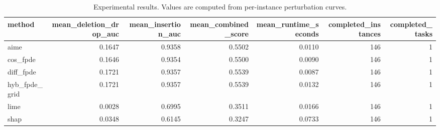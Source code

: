 \begin{table}[t]
\caption{Experimental results. Values are computed from per-instance perturbation curves.}
\label{tab:main_results_computed}
\centering
\begin{tabular}{lrrrrrr}
\toprule
method & mean\_deletion\_drop\_auc & mean\_insertion\_auc & mean\_combined\_score & mean\_runtime\_seconds & completed\_instances & completed\_tasks \\
\midrule
aime & 0.1647 & 0.9358 & 0.5502 & 0.0110 & 146 & 1 \\
cos\_fpde & 0.1646 & 0.9354 & 0.5500 & 0.0090 & 146 & 1 \\
diff\_fpde & 0.1721 & 0.9357 & 0.5539 & 0.0087 & 146 & 1 \\
hyb\_fpde\_grid & 0.1721 & 0.9357 & 0.5539 & 0.0132 & 146 & 1 \\
lime & 0.0028 & 0.6995 & 0.3511 & 0.0166 & 146 & 1 \\
shap & 0.0348 & 0.6145 & 0.3247 & 0.0733 & 146 & 1 \\
\bottomrule
\end{tabular}

\end{table}
